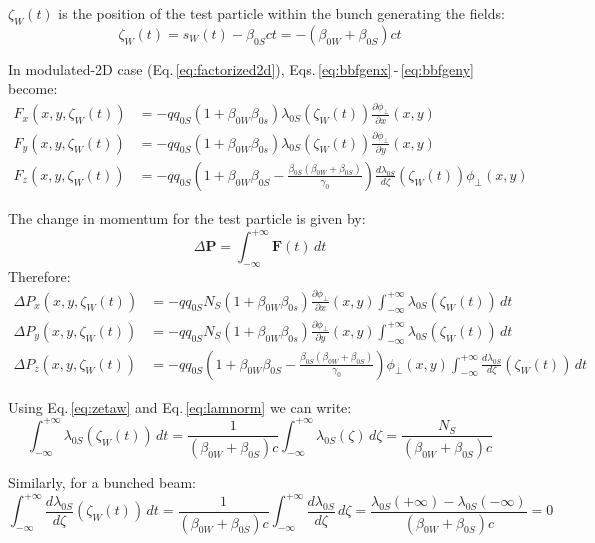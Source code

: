 $\zeta_W(t)$ is the position of the test particle within the bunch generating the fields: 
\begin{equation}
\zeta_W(t)= s_W(t) -\beta_{0S} c t  = -(\beta_{0W}+\beta_{0S})ct
\label{eq:zetaw}
\end{equation}

In modulated-2D case (Eq.\,\ref{eq:factorized2d}), Eqs.\,\eqref{eq:bbfgenx}\,-\,\eqref{eq:bbfgeny} become:
\begin{align}
F_x(x, y, \zeta_W(t)) &=  -q q_{0S} (1+\beta_{0W}  \beta_{0s})
\lambda_{0S}(\zeta_W(t))
 \frac{\partial \phi_\perp}{\partial x}(x, y ) \\
F_y(x, y, \zeta_W(t)) &=  -qq_{0S}  (1+\beta_{0W}  \beta_{0s})
\lambda_{0S}(\zeta_W(t))
 \frac{\partial \phi_\perp}{\partial y}(x, y ) \\
F_z(x, y, \zeta_W(t)) &=  -qq_{0S}\left(1+\beta_{0W}  \beta_{0S} -\frac{\beta_{0S}(\beta_{0W}+\beta_{0S})}{\gamma_0}\right) \frac{d \lambda_{0S}}{d \zeta}(\zeta_W(t)) \phi_\perp(x, y)
\end{align}

The change in momentum for the test particle is given by:
\begin{equation}
\Delta \textbf{P} = \int_{-\infty}^{+\infty} \textbf{F}(t) \,dt
\end{equation}
Therefore:
\begin{align}
\Delta P_x(x, y, \zeta_W(t)) &=  -qq_{0S} N_S (1+\beta_{0W}  \beta_{0s})
\frac{\partial \phi_\perp}{\partial x}(x, y ) \int_{-\infty}^{+\infty}\lambda_{0S}(\zeta_W(t)) \,dt\\
\Delta P_y(x, y, \zeta_W(t)) &=  -qq_{0S} N_S (1+\beta_{0W}  \beta_{0s})
 \frac{\partial \phi_\perp}{\partial y}(x, y ) \int_{-\infty}^{+\infty}\lambda_{0S}(\zeta_W(t)) \,dt\\
\Delta P_z(x, y, \zeta_W(t)) &=  -qq_{0S}\left(1+\beta_{0W}  \beta_{0S} -\frac{\beta_{0S}(\beta_{0W}+\beta_{0S})}{\gamma_0}\right) \phi_\perp(x, y) \int_{-\infty}^{+\infty}\frac{d \lambda_{0S}}{d \zeta}(\zeta_W(t)) \, dt
\end{align}

Using Eq.\,\eqref{eq:zetaw} and Eq.\,\eqref{eq:lamnorm} we can write:
\begin{equation}
\int_{-\infty}^{+\infty}\lambda_{0S}(\zeta_W(t)) \,dt 
=\frac{1}{(\beta_{0W}+\beta_{0S})c}\int_{-\infty}^{+\infty}\lambda_{0S}(\zeta) \,d\zeta = \frac{N_S}{(\beta_{0W}+\beta_{0S})c}
\end{equation}

Similarly, for a bunched beam:
\begin{equation}
\int_{-\infty}^{+\infty}
\frac{d \lambda_{0S}}{d \zeta}(\zeta_W(t)) \,dt 
=\frac{1}{(\beta_{0W}+\beta_{0S})c}\int_{-\infty}^{+\infty}\frac{d \lambda_{0S}}{d \zeta} \,d\zeta = \frac{ \lambda_{0S}(+\infty)-\lambda_{0S}(-\infty)}{(\beta_{0W}+\beta_{0S})c} = 0
\end{equation}

